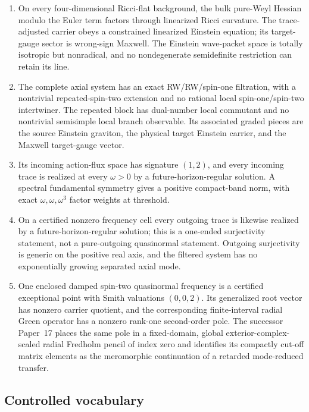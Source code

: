 \documentclass[11pt]{article}
\theoremstyle{definition}
\theoremstyle{remark}
\begin{document}
\begin{enumerate}
\item On every four-dimensional Ricci-flat background, the bulk pure-Weyl
Hessian modulo the Euler term factors through linearized Ricci curvature.
The trace-adjusted carrier obeys a constrained linearized Einstein equation;
its target-gauge sector is wrong-sign Maxwell.  The Einstein wave-packet
space is totally isotropic but nonradical, and no nondegenerate semidefinite
restriction can retain its line.
\item The complete axial system has an exact RW/RW/spin-one filtration, with
a nontrivial repeated-spin-two extension and no rational local
spin-one/spin-two intertwiner.  The repeated block has dual-number local
commutant and no nontrivial semisimple local branch observable.  Its
associated graded pieces are the source Einstein graviton, the physical
target Einstein carrier, and the Maxwell target-gauge vector.
\item Its incoming action-flux space has signature \((1,2)\), and every
incoming trace is realized at every \(\omega>0\) by a
future-horizon-regular solution.  A spectral
fundamental symmetry gives a positive compact-band norm, with exact
\(\omega,\omega,\omega^3\) factor weights at threshold.
\item On a certified nonzero frequency cell every outgoing trace is likewise
realized by a future-horizon-regular solution; this is a one-ended
surjectivity statement, not a pure-outgoing quasinormal statement.  Outgoing
surjectivity is generic on the positive real axis, and the filtered system
has no exponentially growing separated axial mode.
\item One enclosed damped spin-two quasinormal frequency is a certified
exceptional point with Smith valuations \((0,0,2)\).  Its generalized root
vector has nonzero carrier quotient, and the corresponding finite-interval
radial Green operator has a nonzero rank-one second-order pole.  The
successor Paper~17 places the same pole in a fixed-domain, global
exterior-complex-scaled radial Fredholm pencil of index zero and identifies
its compactly cut-off matrix elements as the meromorphic continuation of a
retarded mode-reduced transfer.
\end{enumerate}

\subsection{Controlled vocabulary}
\end{document}
